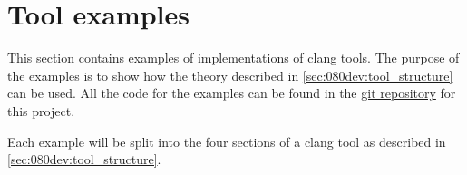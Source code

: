 \chapter{Tool examples}
This section contains examples of implementations of clang tools. The purpose of the examples is to show how the theory described in \cref{sec:080dev:tool_structure} can be used. All the code for the examples can be found in the \href{https://github.com/mortenhaahr/RD/tree/main/examples}{git repository} for this project. 

Each example will be split into the four sections of a clang tool as described in \cref{sec:080dev:tool_structure}.

